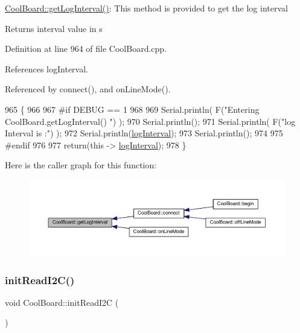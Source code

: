 \hyperlink{classCoolBoard_a7508e029f2ee17bb747ffab599285e0d}{Cool\+Board\+::get\+Log\+Interval()}\+: This method is provided to get the log interval

\begin{DoxyReturn}{Returns}
interval value in s 
\end{DoxyReturn}


Definition at line 964 of file Cool\+Board.\+cpp.



References log\+Interval.



Referenced by connect(), and on\+Line\+Mode().


\begin{DoxyCode}
965 \{
966 
967 \textcolor{preprocessor}{#if DEBUG == 1}
968 
969     Serial.println( F(\textcolor{stringliteral}{"Entering CoolBoard.getLogInterval() "}) );
970     Serial.println();
971     Serial.println( F(\textcolor{stringliteral}{"log Interval is :"}) );
972     Serial.println(\hyperlink{classCoolBoard_a84bc94413b64973e4aba8c467c97006c}{logInterval});
973     Serial.println();
974 
975 \textcolor{preprocessor}{#endif}
976 
977     \textcolor{keywordflow}{return}(\textcolor{keyword}{this} -> \hyperlink{classCoolBoard_a84bc94413b64973e4aba8c467c97006c}{logInterval});
978 \}
\end{DoxyCode}
Here is the caller graph for this function\+:
\nopagebreak
\begin{figure}[H]
\begin{center}
\leavevmode
\includegraphics[width=350pt]{classCoolBoard_a7508e029f2ee17bb747ffab599285e0d_icgraph}
\end{center}
\end{figure}
\mbox{\label{classCoolBoard_a397b46fadab8f530a8cf4d914c561366}} 
\subsubsection{\texorpdfstring{init\+Read\+I2\+C()}{initReadI2C()}}
{\footnotesize\ttfamily void Cool\+Board\+::init\+Read\+I2C (\begin{DoxyParamCaption}{ }\end{DoxyParamCaption})}

